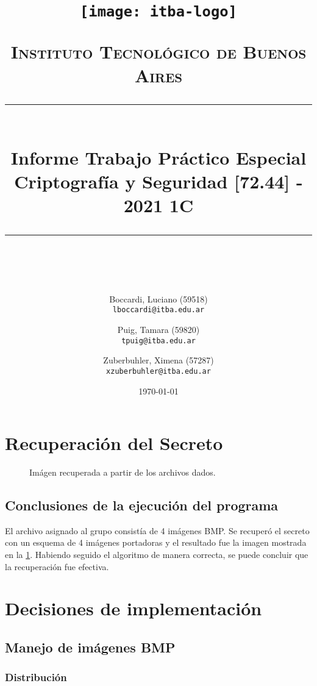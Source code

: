 \documentclass[11pt]{scrartcl} %
\title{	
	\begin{center}
		\texttt{[image: itba-logo]}
	\end{center}
	\vspace{25pt} %
	\normalfont\normalsize
	\textsc{Instituto Tecnológico de Buenos Aires}\\ %
	\vspace{25pt} %
	\rule{\linewidth}{0.5pt}\\ %
	\vspace{20pt} %
	{\huge Informe Trabajo Práctico Especial}\\ %
	\vspace{25pt} %
	{\huge Criptografía y Seguridad [72.44] - 2021 1C}\\ %
	\vspace{12pt} %
	\rule{\linewidth}{2pt}\\ %
	\vspace{12pt} %
}
\author{
  Boccardi, Luciano (59518)\\
  \texttt{lboccardi@itba.edu.ar}
  \and
  Puig, Tamara (59820)\\
  \texttt{tpuig@itba.edu.ar}
  \and
  Zuberbuhler, Ximena (57287)\\
  \texttt{xzuberbuhler@itba.edu.ar}
}
\date{\normalsize\today} %
\begin{document}
\maketitle %


\newpage

\section{Recuperación del Secreto}

\begin{figure}[h] %
	\centering
	\caption{Imágen recuperada a partir de los archivos dados.}
	\label{secret_image}
\end{figure}


\subsection{Conclusiones de la ejecución del programa}

El archivo asignado al grupo consistía de 4 imágenes BMP. Se recuperó el secreto con un esquema de 4 imágenes portadoras y el resultado fue la imagen mostrada en la \figurename{\ref{secret_image}}. Habiendo seguido el algoritmo de manera correcta, se puede concluir que la recuperación fue efectiva.


\section{Decisiones de implementación}

\subsection{Manejo de imágenes BMP}

\subsubsection{Distribución}
\end{document}
